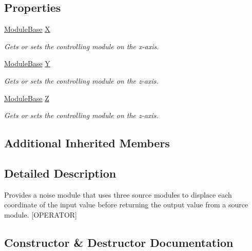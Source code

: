 \subsection*{Properties}
\begin{DoxyCompactItemize}
\item 
\hyperlink{class_lib_noise_1_1_module_base}{Module\+Base} \hyperlink{class_lib_noise_1_1_operator_1_1_displace_a8196501b70314af3812cd9679309422a}{X}
\begin{DoxyCompactList}\small\item\em Gets or sets the controlling module on the x-\/axis. \end{DoxyCompactList}\item 
\hyperlink{class_lib_noise_1_1_module_base}{Module\+Base} \hyperlink{class_lib_noise_1_1_operator_1_1_displace_a1da92f5c8dff7e3981d2d110b81b7e76}{Y}
\begin{DoxyCompactList}\small\item\em Gets or sets the controlling module on the z-\/axis. \end{DoxyCompactList}\item 
\hyperlink{class_lib_noise_1_1_module_base}{Module\+Base} \hyperlink{class_lib_noise_1_1_operator_1_1_displace_a1854a6666dc802dfe47a9728da11b994}{Z}
\begin{DoxyCompactList}\small\item\em Gets or sets the controlling module on the z-\/axis. \end{DoxyCompactList}\end{DoxyCompactItemize}
\subsection*{Additional Inherited Members}


\subsection{Detailed Description}
Provides a noise module that uses three source modules to displace each coordinate of the input value before returning the output value from a source module. \mbox{[}O\+P\+E\+R\+A\+T\+OR\mbox{]} 



\subsection{Constructor \& Destructor Documentation}
\mbox{\label{class_lib_noise_1_1_operator_1_1_displace_afc80e16dd23e8d92264d41de12352c78}} 
